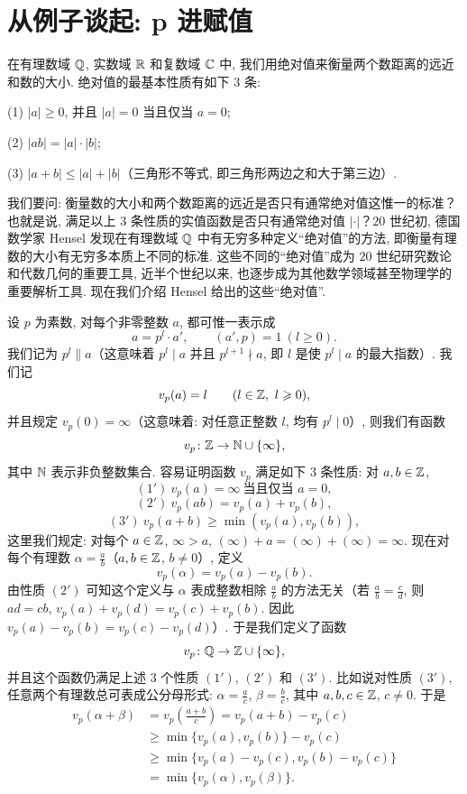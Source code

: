 \section{从例子谈起: p 进赋值}\label{sec:ch7-s1}

在有理数域 $\mathbb{Q}$, 实数域 $\mathbb{R}$ 和复数域 $\mathbb{C}$ 中, 我们用绝对值来衡量两个数距离的远近和数的大小. 绝对值的最基本性质有如下 $3$ 条:

(1) $|a|\geqslant 0$, 并且 $|a|=0$ 当且仅当 $a=0$;

(2) $|ab|=|a|\cdot|b|$;

(3) $|a+b|\leqslant|a|+|b|$（三角形不等式, 即三角形两边之和大于第三边）.

我们要问: 衡量数的大小和两个数距离的远近是否只有通常绝对值这惟一的标准？也就是说, 满足以上 $3$ 条性质的实值函数是否只有通常绝对值 $|\cdot|$？$20$ 世纪初, 德国数学家 Hensel 发现在有理数域 $\mathbb{Q}$ 中有无穷多种定义``绝对值''的方法, 即衡量有理数的大小有无穷多本质上不同的标准. 这些不同的``绝对值''成为 $20$ 世纪研究数论和代数几何的重要工具, 近半个世纪以来, 也逐步成为其他数学领域甚至物理学的重要解析工具. 现在我们介绍 Hensel 给出的这些``绝对值''.

设 $p$ 为素数, 对每个非零整数 $a$, 都可惟一表示成
\[
  a=p^l\cdot a',\qquad(a',p)=1\ (l\geqslant 0).
\]
我们记为 $p^l\parallel a$（这意味着 $p^l\mid a$ 并且 $p^{l+1}\nmid a$, 即 $l$ 是使 $p^l\mid a$ 的最大指数）. 我们记
\[
  v_p(a)=l\qquad(l\in\mathbb{Z},\ l\geqslant 0),
\]
并且规定 $v_p(0)=\infty$（这意味着: 对任意正整数 $l$, 均有 $p^l\mid 0$）, 则我们有函数
\[
  v_p\colon\mathbb{Z}\to\mathbb{N}\cup\{\infty\},
\]
其中 $\mathbb{N}$ 表示非负整数集合. 容易证明函数 $v_p$ 满足如下 $3$ 条性质: 对 $a,b\in\mathbb{Z}$,
\[
  (1')\ v_p(a)=\infty\ \text{当且仅当 } a=0,
\]
\[
  (2')\ v_p(ab)=v_p(a)+v_p(b),
\]
\[
  (3')\ v_p(a+b)\geqslant\min(v_p(a),v_p(b)),
\]
这里我们规定: 对每个 $a\in\mathbb{Z}$, $\infty>a$, $(\infty)+a=(\infty)+(\infty)=\infty$. 现在对每个有理数 $\alpha=\frac{a}{b}$（$a,b\in\mathbb{Z}$, $b\neq 0$）, 定义
\[
  v_p(\alpha)=v_p(a)-v_p(b).
\]
由性质 $(2')$ 可知这个定义与 $\alpha$ 表成整数相除 $\frac{a}{b}$ 的方法无关（若 $\frac{a}{b}=\frac{c}{d}$, 则 $ad=cb$, $v_p(a)+v_p(d)=v_p(c)+v_p(b)$. 因此 $v_p(a)-v_p(b)=v_p(c)-v_p(d)$）. 于是我们定义了函数
\[
  v_p\colon\mathbb{Q}\to\mathbb{Z}\cup\{\infty\},
\]
并且这个函数仍满足上述 $3$ 个性质 $(1')$, $(2')$ 和 $(3')$. 比如说对性质 $(3')$, 任意两个有理数总可表成公分母形式: $\alpha=\frac{a}{c}$, $\beta=\frac{b}{c}$, 其中 $a,b,c\in\mathbb{Z}$, $c\neq 0$. 于是
\begin{align*}
  v_p(\alpha+\beta)&=v_p\left(\frac{a+b}{c}\right)=v_p(a+b)-v_p(c)\\
  &\geqslant\min\{v_p(a),v_p(b)\}-v_p(c)\\
  &\geqslant\min\{v_p(a)-v_p(c),v_p(b)-v_p(c)\}\\
  &=\min\{v_p(\alpha),v_p(\beta)\}.
\end{align*}

